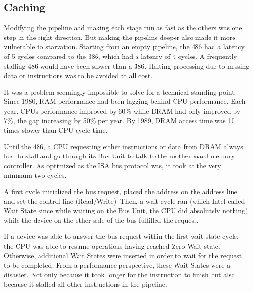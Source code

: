 \subsection{Caching }
Modifying the pipeline and making each stage run as fast as the others was one step in the right direction. But making the pipeline deeper also made it more vulnerable to starvation. Starting from an empty pipeline, the 486 had a latency of 5 cycles compared to the 386, which had a latency of 4 cycles. A frequently stalling 486 would have been slower than a 386. Halting processing due to missing data or instructions was to be avoided at all cost.\\
\par
It was a problem seemingly impossible to solve for a technical standing point. Since 1980, RAM performance had been lagging behind CPU performance. Each year, CPUs performance improved by 60\% while DRAM had only improved by 7\%, the gap increasing by 50\% per year. By 1989, DRAM access time was 10 times slower than CPU cycle time.\\
\par
\vspace{2mm}
\par
Until the 486, a CPU requesting either instructions or data from DRAM always had to stall and go through its Bus Unit to talk to the motherboard memory controller. As optimized as the ISA bus protocol was, it took at the very minimum two cycles.\\
\par 
A first cycle initialized the bus request, placed the address on the address line and set the control line (Read/Write). Then, a wait cycle ran (which Intel called Wait State since while waiting on the Bus Unit, the CPU did absolutely nothing) while the device on the other side of the bus fulfilled the request.\\
\par
{}
\par
If a device was able to answer the bus request within the first wait state cycle, the CPU was able to resume operations having reached Zero Wait state. Otherwise, additional Wait States were inserted in order to wait for the request to be completed. From a performance perspective, these Wait States were a disaster. Not only because it took longer for the instruction to finish but also because it stalled all other instructions in the pipeline.\\
